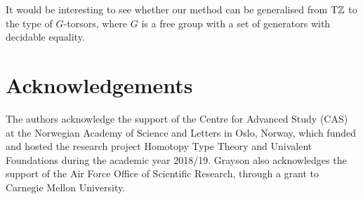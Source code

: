 \documentclass[a4paper,12pt]{amsart}
\begin{document}
It would be interesting to see whether our method can be generalised
from ${\mathrm{T}\mathbb{Z}}$ to the type of $G$-torsors, where $G$ is a free group with
a set of generators with decidable equality.

\section{Acknowledgements}
The authors acknowledge the support of the Centre for Advanced Study (CAS)
at the Norwegian Academy of Science and Letters
in Oslo, Norway, which funded and hosted the research project Homotopy Type Theory and Univalent Foundations during the academic year 2018/19. 
Grayson also acknowledges the support of the Air Force Office of Scientific Research, through a grant to Carnegie Mellon University.




\end{document}
